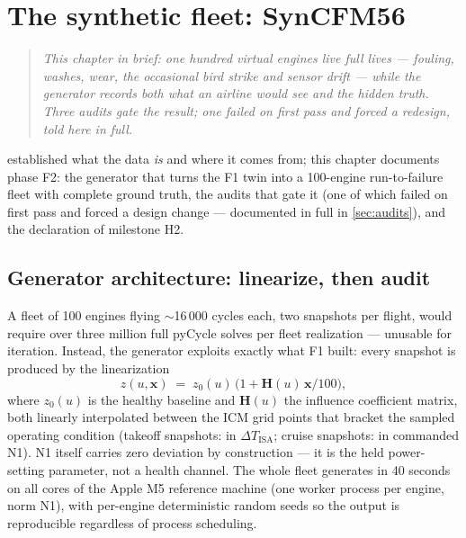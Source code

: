 \chapter{The synthetic fleet: SynCFM56}
\label{ch:fleet}

\begin{quote}\itshape
This chapter in brief: one hundred virtual engines live full lives --- fouling, washes, wear,
the occasional bird strike and sensor drift --- while the generator records both what an
airline would see and the hidden truth. Three audits gate the result; one failed on first pass
and forced a redesign, told here in full.
\end{quote}



 established what the data \emph{is} and where it comes from; this chapter
documents phase F2: the generator that turns the F1 twin into a 100-engine
run-to-failure fleet with complete ground truth, the audits that gate it (one of which failed
on first pass and forced a design change --- documented in full in \cref{sec:audits}), and the
declaration of milestone H2.

\section{Generator architecture: linearize, then audit}
\label{sec:fleet-arch}

A fleet of 100 engines flying $\sim$16\,000 cycles each, two snapshots per flight, would
require over three million full pyCycle solves per fleet realization --- unusable for
iteration. Instead, the generator exploits exactly what F1 built: every snapshot is produced by
the linearization
\begin{equation}
  z(u, \mathbf{x}) \;=\; z_0(u)\,\bigl(1 + \mathbf{H}(u)\,\mathbf{x}/100\bigr),
  \label{eq:generator}
\end{equation}
where $z_0(u)$ is the healthy baseline and $\mathbf{H}(u)$ the influence coefficient matrix,
both linearly interpolated between the ICM grid points that bracket the sampled operating
condition (takeoff snapshots: in $\Delta T_{\mathrm{ISA}}$; cruise snapshots: in commanded N1).
N1 itself carries zero deviation by construction --- it is the held power-setting parameter,
not a health channel. The whole fleet generates in 40 seconds on all cores of the Apple M5 reference machine (one worker process
per engine, norm N1), with per-engine deterministic random seeds so the output is reproducible
regardless of process scheduling.

